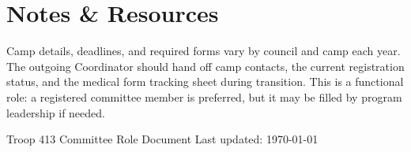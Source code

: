 \documentclass[11pt, letterpaper]{article}
\begin{document}
\vspace{0.6em}

\section{Notes \& Resources}
Camp details, deadlines, and required forms vary by council and camp each year. The outgoing Coordinator should hand off camp contacts, the current registration status, and the medical form tracking sheet during transition. This is a functional role: a registered committee member is preferred, but it may be filled by program leadership if needed.

\vfill
\begin{center}
  \footnotesize\color{gray}
  Troop 413 \textbullet{} Committee Role Document \textbullet{} Last updated: \today
\end{center}
\end{document}
